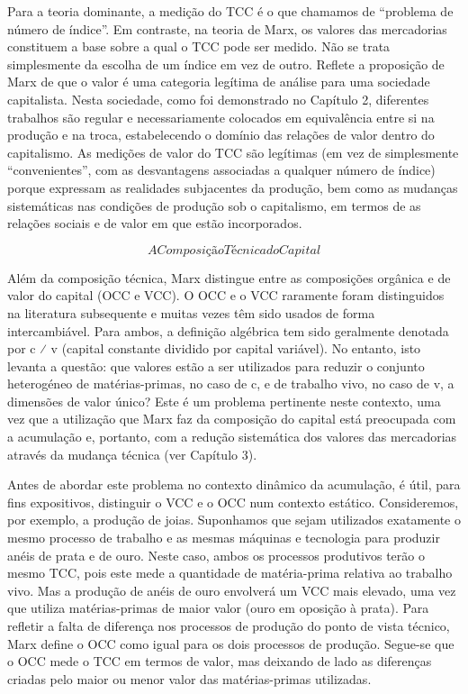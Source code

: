  \par 
Para a teoria dominante, a medição do TCC é o que chamamos de “problema de número de índice”. Em contraste, na teoria de Marx, os valores das mercadorias constituem a base sobre a qual o TCC pode ser medido. Não se trata simplesmente da escolha de um índice em vez de outro. Reflete a proposição de Marx de que o valor é uma categoria legítima de análise para uma sociedade capitalista. Nesta sociedade, como foi demonstrado no Capítulo 2, diferentes trabalhos são regular e necessariamente colocados em equivalência entre si na produção e na troca, estabelecendo o domínio das relações de valor dentro do capitalismo. As medições de valor do TCC são legítimas (em vez de simplesmente “convenientes”, com as desvantagens associadas a qualquer número de índice) porque expressam as realidades subjacentes da produção, bem como as mudanças sistemáticas nas condições de produção sob o capitalismo, em termos de as relações sociais e de valor em que estão incorporados.
 \par 
\[A Composição Técnica do Capital\]
 \par 
Além da composição técnica, Marx distingue entre as composições orgânica e de valor do capital (OCC e VCC). O OCC e o VCC raramente foram distinguidos na literatura subsequente e muitas vezes têm sido usados ​​de forma intercambiável. Para ambos, a definição algébrica tem sido geralmente denotada por c ⁄ v (capital constante dividido por capital variável). No entanto, isto levanta a questão: que valores estão a ser utilizados para reduzir o conjunto heterogéneo de matérias-primas, no caso de c, e de trabalho vivo, no caso de v, a dimensões de valor único? Este é um problema pertinente neste contexto, uma vez que a utilização que Marx faz da composição do capital está preocupada com a acumulação e, portanto, com a redução sistemática dos valores das mercadorias através da mudança técnica (ver Capítulo {\color{blue}3}).
 \par 
Antes de abordar este problema no contexto dinâmico da acumulação, é útil, para fins expositivos, distinguir o VCC e o OCC num contexto estático. Consideremos, por exemplo, a produção de joias. Suponhamos que sejam utilizados exatamente o mesmo processo de trabalho e as mesmas máquinas e tecnologia para produzir anéis de prata e de ouro. Neste caso, ambos os processos produtivos terão o mesmo TCC, pois este mede a quantidade de matéria-prima relativa ao trabalho vivo. Mas a produção de anéis de ouro envolverá um VCC mais elevado, uma vez que utiliza matérias-primas de maior valor (ouro em oposição à prata). Para refletir a falta de diferença nos processos de produção do ponto de vista técnico, Marx define o OCC como igual para os dois processos de produção. Segue-se que o OCC mede o TCC em termos de valor, mas deixando de lado as diferenças criadas pelo maior ou menor valor das matérias-primas utilizadas.
